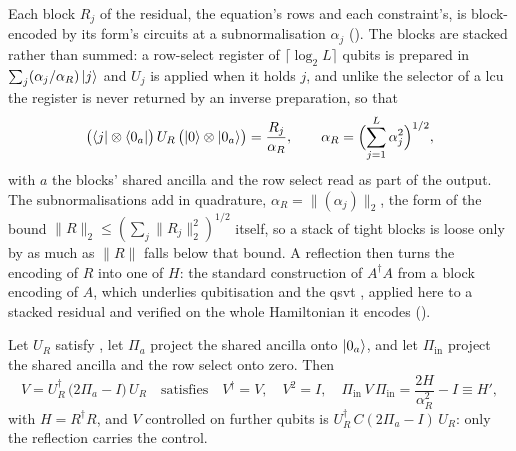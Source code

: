 Each block $R_j$ of the residual, the equation's rows and each constraint's, is block-encoded by its form's circuits at a subnormalisation $\alpha_j$ (). The blocks are stacked rather than summed: a row-select register of $\lceil\log_2L\rceil$ qubits is prepared in $\sum_j(\alpha_j/\alpha_R)\ket{j}$ and $U_j$ is applied when it holds $j$, and unlike the selector of a \gls{lcu} the register is never returned by an inverse preparation, so that
\begin{equation}
    \bigl(\bra{j}\otimes\bra{0_a}\bigr)\,U_R\,\bigl(\ket{0}\otimes\ket{0_a}\bigr)=\frac{R_j}{\alpha_R},
    \qquad
    \alpha_R=\Bigl(\sum_{j=1}^{L}\alpha_j^2\Bigr)^{1/2},
    \label{eq:stacked-encoding}
\end{equation}
with $a$ the blocks' shared ancilla and the row select read as part of the output. The subnormalisations add in quadrature, $\alpha_R=\|(\alpha_j)\|_2$, the form of the bound $\|R\|_2\le(\sum_j\|R_j\|_2^2)^{1/2}$ itself, so a stack of tight blocks is loose only by as much as $\|R\|$ falls below that bound. A reflection then turns the encoding of $R$ into one of $H$: the standard construction of $A^\dagger A$ from a block encoding of $A$, which underlies qubitisation and the \gls{qsvt} \cite{lowchuang2019qubitization,gilyen2019qsvt}, applied here to a stacked residual and verified on the whole Hamiltonian it encodes ().

\begin{proposition}
\label{prop:stacked-reflection}
Let $U_R$ satisfy , let $\Pi_a$ project the shared ancilla onto $\ket{0_a}$, and let $\Pi_{\mathrm{in}}$ project the shared ancilla and the row select onto zero. Then
\begin{equation}
    V=U_R^{\dagger}\,\bigl(2\Pi_a-I\bigr)\,U_R
    \quad\text{satisfies}\quad
    V^{\dagger}=V,\quad V^2=I,\quad
    \Pi_{\mathrm{in}}\,V\,\Pi_{\mathrm{in}}=\frac{2H}{\alpha_R^2}-I\equiv H',
    \label{eq:stacked-reflection}
\end{equation}
with $H=R^\dagger R$, and $V$ controlled on further qubits is $U_R^\dagger\,C(2\Pi_a-I)\,U_R$: only the reflection carries the control.
\end{proposition}


